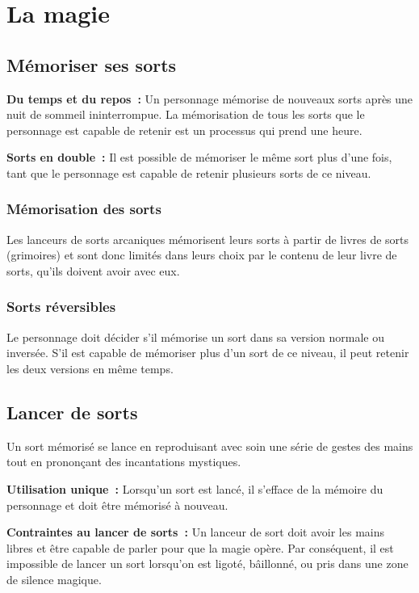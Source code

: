 \section{La magie}
\subsection{Mémoriser ses sorts}\label{muxe9moriser-ses-sorts}

\textbf{Du temps et du repos~:} Un personnage mémorise de nouveaux sorts
après une nuit de sommeil ininterrompue. La mémorisation de tous les
sorts que le personnage est capable de retenir est un processus qui
prend une heure.

\textbf{Sorts en double~:} Il est possible de mémoriser le même sort
plus d'une fois, tant que le personnage est capable de retenir plusieurs
sorts de ce niveau.


\subsubsection{Mémorisation des sorts}\label{muxe9morisation-des-sorts}

Les lanceurs de sorts arcaniques mémorisent leurs sorts à partir de
livres de sorts (grimoires) et sont donc limités dans leurs choix par le
contenu de leur livre de sorts, qu'ils doivent avoir avec eux.

\subsubsection{Sorts réversibles}\label{sorts-ruxe9versibles}

Le personnage doit décider s'il mémorise un sort dans sa version normale
ou inversée. S'il est capable de mémoriser plus d'un sort de ce niveau,
il peut retenir les deux versions en même temps.

\subsection{Lancer de sorts}\label{lancer-de-sorts}

Un sort mémorisé se lance en reproduisant avec soin une série de gestes
des mains tout en prononçant des incantations mystiques.

\textbf{Utilisation unique~:} Lorsqu'un sort est lancé, il s'efface de
la mémoire du personnage et doit être mémorisé à nouveau.

\textbf{Contraintes au lancer de sorts~:} Un lanceur de sort doit avoir
les mains libres et être capable de parler pour que la magie opère. Par
conséquent, il est impossible de lancer un sort lorsqu'on est ligoté,
bâillonné, ou pris dans une zone de silence magique.

